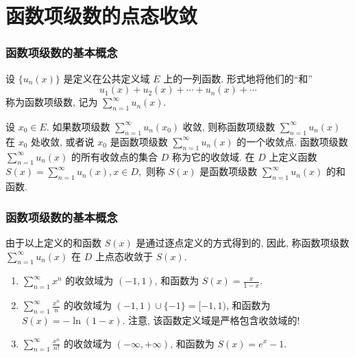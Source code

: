 
\section{函数项级数的点态收敛}


\begin{frame}
\frametitle{函数项级数的基本概念}

\begin{Def}[函数项级数]
设 $\{u_n(x)\}$ 是定义在公共定义域 $E$ 上的一列函数. 形式地将他们的``和''
\[
u_1(x) + u_2(x) + \cdots + u_n(x) + \cdots
\]
称为\alert{函数项级数}, 记为 $\sum_{n=1}^\infty u_n(x).$
\end{Def}

\pause

\begin{Def}[函数项级数的收敛域与和函数]
设 $x_0 \in E.$ 如果数项级数 $\sum_{n=1}^\infty u_n(x_0)$ 收敛, 则称函数项级数 $\sum_{n=1}^\infty u_n(x)$ 在 $x_0$ 处收敛, 或者说 $x_0$ 是函数项级数 $\sum_{n=1}^\infty u_n(x)$ 的一个收敛点. 函数项级数 $\sum_{n=1}^\infty u_n(x)$ 的所有收敛点的集合 $D$ 称为它的\alert{收敛域}. 在 $D$ 上定义函数 $S(x) = \sum_{n=1}^\infty u_n(x), x \in D,$ 则称 $S(x)$ 是函数项级数 $\sum_{n=1}^\infty u_n(x)$ 的\alert{和函数}.
\end{Def}

\end{frame}


\begin{frame}
\frametitle{函数项级数的基本概念}

\begin{remark}
由于以上定义的和函数 $S(x)$ 是通过逐点定义的方式得到的, 因此, 称函数项级数 $\sum_{n=1}^\infty u_n(x)$ 在 $D$ 上\alert{点态收敛}于 $S(x).$
\end{remark}

\pause

\begin{eg}
\begin{enumerate}
\item $\sum_{n=1}^\infty x^n$ 的收敛域为 $(-1, 1)$, 和函数为 $S(x) = \frac{x}{1-x}.$
\pause
\item $\sum_{n=1}^\infty \frac{x^n}{n}$ 的收敛域为 $(-1, 1) \cup \{-1\} = [-1, 1)$, 和函数为 $S(x) = -\ln(1-x).$
\pause
注意, 该函数定义域是严格包含收敛域的!
\pause
\item $\sum_{n=1}^\infty \frac{x^n}{n!}$ 的收敛域为 $(-\infty, +\infty)$, 和函数为 $S(x) = e^x - 1.$
\end{enumerate}
\end{eg}

\end{frame}

